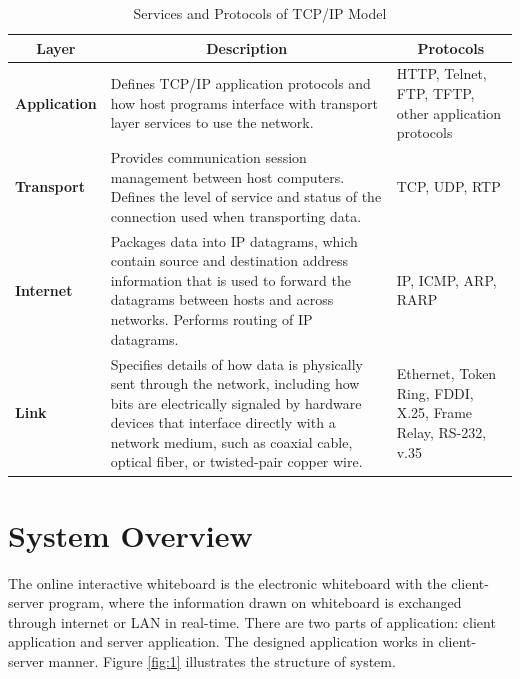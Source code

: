 \documentclass[conference]{IEEEtran}
\begin{document}
\begin{table}[h]
  \renewcommand{\arraystretch}{2}
  \renewcommand{\tabcolsep}{2mm}
 
  \begin{tabularx}{0.5\textwidth}{|p{1.5cm}|p{4.3cm}|p{2cm}|}
    \hline
    \multicolumn{1}{|c|}{\textbf{Layer}} &  
    \multicolumn{1}{c|}{\textbf{Description}} &
    \multicolumn{1}{c|}{\textbf{Protocols}} \\ \hline
    \textbf{Application} &  Defines TCP/IP application protocols and how host programs interface with transport layer services to use the network. & HTTP, Telnet, FTP, TFTP, other application protocols \\ \hline 
    \textbf{Transport} &  Provides communication session management between host computers. Defines the level of service and status of the connection used when transporting data. & TCP, UDP, RTP \\ \hline 
     \textbf{Internet} &  Packages data into IP datagrams, which contain source and destination address information that is used to forward the datagrams between hosts and across networks. Performs routing of IP datagrams. & IP, ICMP, ARP, RARP \\ \hline 
     \textbf{Link} &  Specifies details of how data is physically sent through the network, including how bits are electrically signaled by hardware devices that interface directly with a network medium, such as coaxial cable, optical fiber, or twisted-pair copper wire. & Ethernet, Token Ring, FDDI, X.25, Frame Relay, RS-232, v.35 \\ \hline 
  \end{tabularx}
  \space
  \caption{Services and Protocols of TCP/IP Model}
  \label{tab:1}
\end{table}

\section{System Overview}

The online interactive whiteboard is the electronic whiteboard with the client-server program, where the information drawn on whiteboard is exchanged through internet or LAN in real-time. 
There are two parts of application: client application and server application. 
The designed application works in client-server manner.  
Figure \ref{fig:1} illustrates the structure of system.
\end{document}

